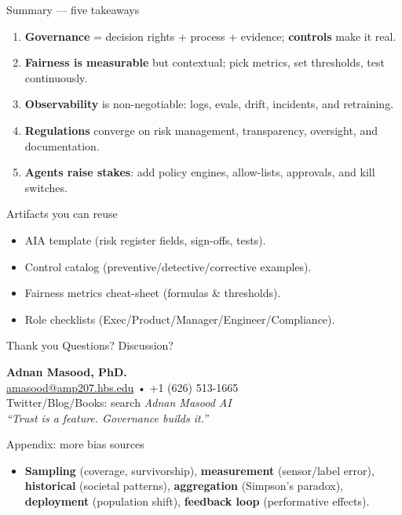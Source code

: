 \documentclass[11pt,aspectratio=169]{beamer}
\begin{document}
\begin{frame}{Summary — five takeaways}
\begin{enumerate}
  \item \textbf{Governance} = decision rights + process + evidence; \textbf{controls} make it real.
  \item \textbf{Fairness is measurable} but contextual; pick metrics, set thresholds, test continuously.
  \item \textbf{Observability} is non-negotiable: logs, evals, drift, incidents, and retraining.
  \item \textbf{Regulations} converge on risk management, transparency, oversight, and documentation.
  \item \textbf{Agents raise stakes}: add policy engines, allow-lists, approvals, and kill switches.
\end{enumerate}
\end{frame}

\begin{frame}{Artifacts you can reuse}
\begin{itemize}
  \item AIA template (risk register fields, sign-offs, tests).
  \item Control catalog (preventive/detective/corrective examples).
  \item Fairness metrics cheat-sheet (formulas \& thresholds).
  \item Role checklists (Exec/Product/Manager/Engineer/Compliance).
\end{itemize}
\end{frame}

\begin{frame}{Thank you}
\Large Questions? Discussion? \par
\medskip
\small
\textbf{Adnan Masood, PhD.}\\
\href{mailto:amasood@amp207.hbs.edu}{amasood@amp207.hbs.edu} \;•\; +1 (626) 513-1665\\
Twitter/Blog/Books: search \emph{Adnan Masood AI}\\
\medskip
\textit{“Trust is a feature. Governance builds it.”}
\end{frame}

\appendix
\begin{frame}{Appendix: more bias sources}
\begin{itemize}
  \item \textbf{Sampling} (coverage, survivorship), \textbf{measurement} (sensor/label error), \textbf{historical} (societal patterns), \textbf{aggregation} (Simpson’s paradox), \textbf{deployment} (population shift), \textbf{feedback loop} (performative effects).
\end{itemize}
\end{frame}
\end{document}
